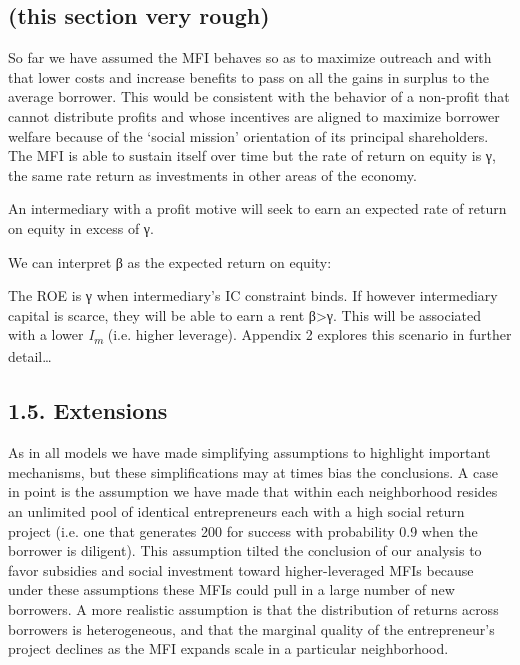 \documentclass{article}
\begin{document}
\subsection{(this section very rough)}\label{this-section-very-rough}

So far we have assumed the MFI behaves so as to maximize outreach and
with that lower costs and increase benefits to pass on all the gains in
surplus to the average borrower. This would be consistent with the
behavior of a non-profit that cannot distribute profits and whose
incentives are aligned to maximize borrower welfare because of the
`social mission' orientation of its principal shareholders. The MFI is
able to sustain itself over time but the rate of return on equity is γ,
the same rate return as investments in other areas of the economy.

An intermediary with a profit motive will seek to earn an expected rate
of return on equity in excess of γ.

We can interpret β as the expected return on equity:

The ROE is γ when intermediary's IC constraint binds. If however
intermediary capital is scarce, they will be able to earn a rent
β\textgreater{}γ. This will be associated with a lower
\emph{I\textsubscript{m }}(i.e. higher leverage). Appendix 2 explores
this scenario in further detail\ldots{}

\subsection{1.5. Extensions}\label{extensions}

As in all models we have made simplifying assumptions to highlight
important mechanisms, but these simplifications may at times bias the
conclusions. A case in point is the assumption we have made that within
each neighborhood resides an unlimited pool of identical entrepreneurs
each with a high social return project (i.e. one that generates 200 for
success with probability 0.9 when the borrower is diligent). This
assumption tilted the conclusion of our analysis to favor subsidies and
social investment toward higher-leveraged MFIs because under these
assumptions these MFIs could pull in a large number of new borrowers. A
more realistic assumption is that the distribution of returns across
borrowers is heterogeneous, and that the marginal quality of the
entrepreneur's project declines as the MFI expands scale in a particular
neighborhood.
\end{document}
